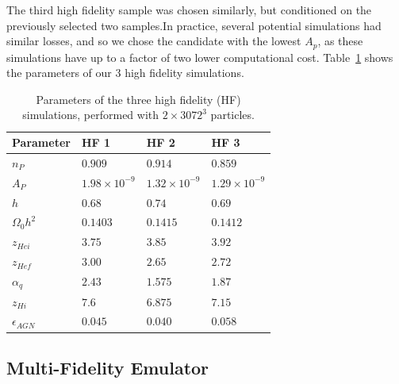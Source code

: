 \documentclass[a4paper,11pt]{article}
\begin{document}
The third high fidelity sample was chosen similarly, but conditioned on the previously selected two samples.In practice, several potential simulations had similar losses, and so we chose the candidate with the lowest $A_p$, as these simulations have up to a factor of two lower computational cost.
Table~\ref{tab:highfidelity} shows the parameters of our $3$ high fidelity simulations.


\begin{table}
\begin{centering}
  \begin{tabular}{llll}
  \hline
  Parameter & HF 1 & HF 2 & HF 3\\
    \hline
    $n_P$  &  $0.909$  & $0.914$ & $0.859$ \\
    $A_P$  &  $1.98 \times 10^{-9}$  & $1.32 \times 10^{-9}$ & $1.29 \times 10^{-9}$\\
    $h$    & $0.68$  & $0.74$ & $0.69$\\
    $\Omega_0 h^2$ & $0.1403$ & $0.1415$ & $0.1412$\\
    $z_{Hei}$      & $3.75$  & $3.85$  & $ 3.92$ \\
    $z_{Hef}$      & $3.00$  & $2.65$  & $2.72$\\
    $\alpha_q$     & $2.43$  & $1.575$ & $ 1.87$ \\
    $z_{Hi}$        & $7.6$ & $6.875$   & $7.15 $\\
    $\epsilon_{AGN}$ & $0.045$ & $0.040$ & $ 0.058$\\
    \hline
  \end{tabular}
  \caption{Parameters of the three high fidelity (HF) simulations, performed with $2\times 3072^3$ particles.}
  \label{tab:highfidelity}
  \end{centering}
\end{table}

\subsection{Multi-Fidelity Emulator}
\label{sec:gpemulator}
\end{document}
